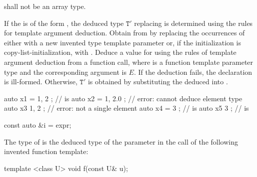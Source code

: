  shall not be an array type.

\pnum
If the  is of the form
 ,
the deduced type
$\mathtt{T}'$ replacing 
is determined using the rules for template argument deduction.
Obtain  from
 by replacing the occurrences of
  either with
a new invented type template parameter  or,
if the initialization is copy-list-initialization, with
. Deduce a value for  using the rules
of template argument deduction from a function call,
where  is a
function template parameter type and
the corresponding argument is $E$.
If the deduction fails, the declaration is ill-formed.
Otherwise, $\mathtt{T}'$ is obtained by
substituting the deduced  into .
\begin{example}
\begin{codeblock}
auto x1 = { 1, 2 };             //  is 
auto x2 = { 1, 2.0 };           // error: cannot deduce element type
auto x3{ 1, 2 };                // error: not a single element
auto x4 = { 3 };                //  is 
auto x5{ 3 };                   //  is 
\end{codeblock}
\end{example}

\begin{example}
\begin{codeblock}
const auto &i = expr;
\end{codeblock}
The type of  is the deduced type of the parameter  in
the call  of the following invented function template:
\begin{codeblock}
template <class U> void f(const U& u);
\end{codeblock}
\end{example}

